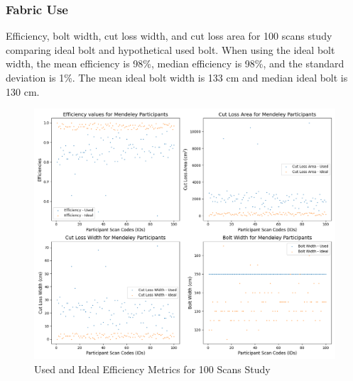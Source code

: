 \subsubsection{Fabric Use}
Efficiency, bolt width, cut loss width, and cut loss area for 100 scans study comparing ideal bolt and hypothetical used bolt.
When using the ideal bolt width, the mean efficiency is 98\%, median efficiency is 98\%, and the standard deviation is 1\%. The mean ideal bolt width is 133 cm and median ideal bolt is 130 cm.
\begin{figure} [H]
    \centering
    \includegraphics[width = \textwidth]{Images/Mendeley_Plot.png} 
    \caption{Used and Ideal Efficiency Metrics for 100 Scans Study}
\end{figure}

